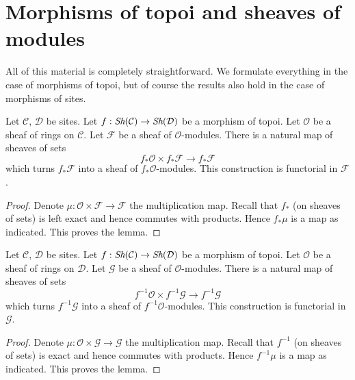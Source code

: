 \section{Morphisms of topoi and sheaves of modules}
\label{section-sheaves-modules-functorial}

\noindent
All of this material is completely straightforward.
We formulate everything in the case of morphisms of topoi,
but of course the results also hold in the case of morphisms of sites.

\begin{lemma}
\label{lemma-pushforward-module}
Let $\mathcal{C}$, $\mathcal{D}$ be sites.
Let $f : \mathop{\textit{Sh}}\nolimits(\mathcal{C}) \to \mathop{\textit{Sh}}\nolimits(\mathcal{D})$
be a morphism of topoi.
Let $\mathcal{O}$ be a sheaf of rings on $\mathcal{C}$.
Let $\mathcal{F}$ be a sheaf of $\mathcal{O}$-modules.
There is a natural map of sheaves of sets
$$
f_*\mathcal{O} \times f_*\mathcal{F}
\longrightarrow
f_*\mathcal{F}
$$
which turns $f_*\mathcal{F}$ into a sheaf of $f_*\mathcal{O}$-modules.
This construction is functorial in $\mathcal{F}$.
\end{lemma}

\begin{proof}
Denote $\mu : \mathcal{O} \times \mathcal{F} \to \mathcal{F}$ the
multiplication map. Recall that $f_*$ (on sheaves of sets) is left exact
and hence commutes with products. Hence $f_*\mu$ is a map as
indicated. This proves the lemma.
\end{proof}

\begin{lemma}
\label{lemma-pullback-module}
Let $\mathcal{C}$, $\mathcal{D}$ be sites.
Let $f : \mathop{\textit{Sh}}\nolimits(\mathcal{C}) \to \mathop{\textit{Sh}}\nolimits(\mathcal{D})$
be a morphism of topoi.
Let $\mathcal{O}$ be a sheaf of rings on $\mathcal{D}$.
Let $\mathcal{G}$ be a sheaf of $\mathcal{O}$-modules.
There is a natural map of sheaves of sets
$$
f^{-1}\mathcal{O} \times f^{-1}\mathcal{G}
\longrightarrow
f^{-1}\mathcal{G}
$$
which turns $f^{-1}\mathcal{G}$ into a sheaf of $f^{-1}\mathcal{O}$-modules.
This construction is functorial in $\mathcal{G}$.
\end{lemma}

\begin{proof}
Denote $\mu : \mathcal{O} \times \mathcal{G} \to \mathcal{G}$ the
multiplication map. Recall that $f^{-1}$ (on sheaves of sets) is exact
and hence commutes with products. Hence $f^{-1}\mu$ is a map as
indicated. This proves the lemma.
\end{proof}

